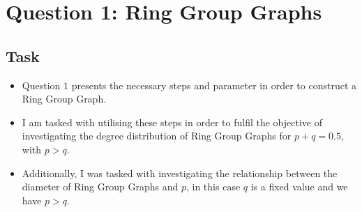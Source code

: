 \documentclass[12pt, a4paper]{article}
\begin{document}
\renewcommand\refname{Bibliography}
\pagestyle{MainStyle}







\section*{Question 1: Ring Group Graphs }
\subsection*{Task}
\begin{itemize}
\renewcommand\labelitemi{\tiny$\bullet$}
\item Question $1$ presents the necessary steps and parameter in order to construct a Ring Group Graph.
\item I am tasked with utilising these steps in order to fulfil the objective of investigating the degree distribution of Ring Group Graphs for $p+q = 0.5$, with $p>q$.
\item Additionally, I was tasked with investigating the relationship between the diameter of Ring Group Graphs and $p$, in this case $q$ is a fixed value and we have $p>q$.
\end{itemize}
\end{document}
